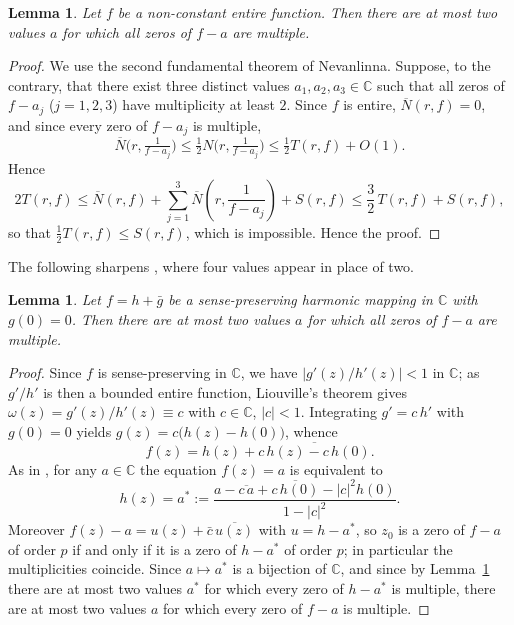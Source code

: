 \documentclass[10pt,a4paper]{amsart}
\newtheorem{lemma}[theorem]{Lemma}
\newcommand{\C}{\mathbb{C}}
\begin{document}
\begin{lemma}\label{lem:entiretwo}
Let $f$ be a non-constant entire function. Then there are at most two values $a$ for which
all zeros of $f-a$ are multiple.
\end{lemma}

\begin{proof}
We use the second fundamental theorem of Nevanlinna. Suppose, to the contrary, that there
exist three distinct values $a_{1},a_{2},a_{3}\in\C$ such that all zeros of $f-a_{j}$
($j=1,2,3$) have multiplicity at least $2$. Since $f$ is entire, $\overline N(r,f)=0$, and
since every zero of $f-a_{j}$ is multiple,
$$\overline N\!\big(r,\tfrac{1}{f-a_{j}}\big)\le\tfrac12 N\!\big(r,\tfrac{1}{f-a_{j}}\big)
\le\tfrac12 T(r,f)+O(1).$$ Hence
\[
2T(r,f)\le \overline N(r,f)+\sum_{j=1}^{3}\overline N\!\left(r,\frac{1}{f-a_{j}}\right)+S(r,f)
\le \frac32\,T(r,f)+S(r,f),
\]
so that $\tfrac12 T(r,f)\le S(r,f)$, which is impossible. Hence the proof.
\end{proof}

The following sharpens \cite[Lemma~3]{DPQ}, where four values appear in place of two.

\begin{lemma}\label{lem:harmtwo}
Let $f=h+\bar g$ be a sense-preserving harmonic mapping in $\C$ with $g(0)=0$. Then there
are at most two values $a$ for which all zeros of $f-a$ are multiple.
\end{lemma}

\begin{proof}
Since $f$ is sense-preserving in $\C$, we have $|g'(z)/h'(z)|<1$ in $\C$; as $g'/h'$ is then
a bounded entire function, Liouville's theorem gives $\omega(z)=g'(z)/h'(z)\equiv c$ with
$c\in\C$, $|c|<1$. Integrating $g'=c\,h'$ with $g(0)=0$ yields $g(z)=c\big(h(z)-h(0)\big)$,
whence
\[
f(z)=h(z)+\overline{c\,h(z)-c\,h(0)}.
\]
As in \cite[Lemma~2.5]{BDP}, for any $a\in\C$ the equation $f(z)=a$ is equivalent to
\begin{equation}\label{eq:correspond}
h(z)=a^{*}:=\frac{a-\overline{c\,a}+\overline{c\,h(0)}-|c|^{2}h(0)}{1-|c|^{2}}.
\end{equation}
Moreover $f(z)-a=u(z)+\bar c\,\overline{u(z)}$ with $u=h-a^{*}$, so $z_{0}$ is a zero of
$f-a$ of order $p$ if and only if it is a zero of $h-a^{*}$ of order $p$; in particular the
multiplicities coincide. Since $a\mapsto a^{*}$ is a bijection of $\C$, and since by
Lemma~\ref{lem:entiretwo} there are at most two values $a^{*}$ for which every zero of
$h-a^{*}$ is multiple, there are at most two values $a$ for which every zero of $f-a$ is
multiple.
\end{proof}
\end{document}
